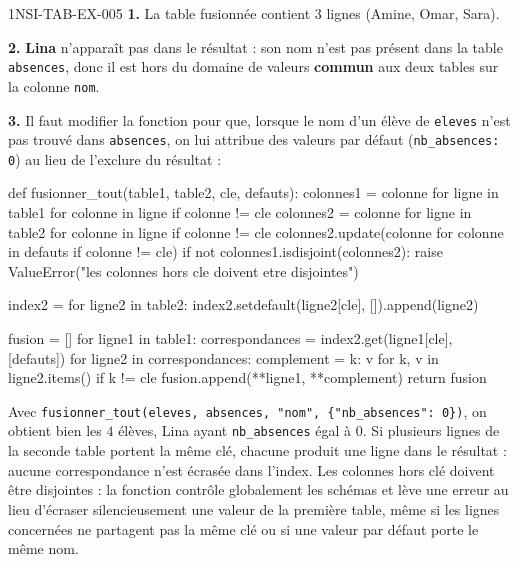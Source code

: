 \begin{corrige}{1NSI-TAB-EX-005}
\textbf{1.} La table fusionnée contient $3$ lignes (Amine, Omar, Sara).

\textbf{2.} \textbf{Lina} n'apparaît pas dans le résultat : son nom n'est pas présent dans
la table \lstinline{absences}, donc il est hors du domaine de valeurs \textbf{commun} aux
deux tables sur la colonne \lstinline{nom}.

\textbf{3.} Il faut modifier la fonction pour que, lorsque le nom d'un élève de
\lstinline{eleves} n'est pas trouvé dans \lstinline{absences}, on lui attribue des valeurs
par défaut (\lstinline{nb_absences: 0}) au lieu de l'exclure du résultat :
\begin{python}
def fusionner_tout(table1, table2, cle, defauts):
    colonnes1 = {
        colonne for ligne in table1 for colonne in ligne if colonne != cle
    }
    colonnes2 = {
        colonne for ligne in table2 for colonne in ligne if colonne != cle
    }
    colonnes2.update(colonne for colonne in defauts if colonne != cle)
    if not colonnes1.isdisjoint(colonnes2):
        raise ValueError("les colonnes hors cle doivent etre disjointes")

    index2 = {}
    for ligne2 in table2:
        index2.setdefault(ligne2[cle], []).append(ligne2)

    fusion = []
    for ligne1 in table1:
        correspondances = index2.get(ligne1[cle], [defauts])
        for ligne2 in correspondances:
            complement = {k: v for k, v in ligne2.items() if k != cle}
            fusion.append({**ligne1, **complement})
    return fusion
\end{python}
Avec \lstinline|fusionner_tout(eleves, absences, "nom", {"nb_absences": 0})|, on obtient
bien les $4$ élèves, Lina ayant \lstinline{nb_absences} égal à $0$. Si plusieurs lignes de
la seconde table portent la même clé, chacune produit une ligne dans le résultat : aucune
correspondance n'est écrasée dans l'index. Les colonnes hors clé doivent être disjointes :
la fonction contrôle globalement les schémas et lève une erreur au lieu d'écraser
silencieusement une valeur de la première table, même si les lignes concernées ne partagent
pas la même clé ou si une valeur par défaut porte le même nom.
\end{corrige}

